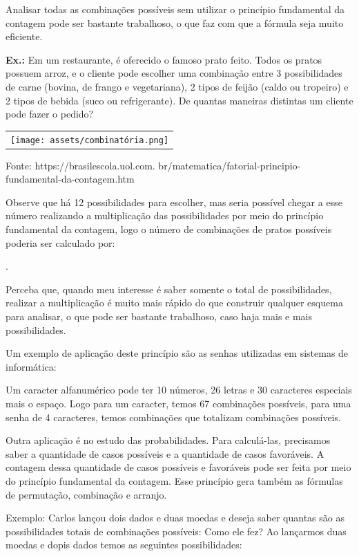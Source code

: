\begin{multicols*}{2}
Analisar todas as combinações possíveis sem utilizar o princípio fundamental da contagem pode ser bastante trabalhoso, o que faz com que a fórmula seja muito eficiente.

\textbf{Ex.:} Em um restaurante, é oferecido o famoso prato feito. Todos os pratos possuem arroz, e o cliente pode escolher uma combinação entre 3 possibilidades de carne (bovina, de frango e vegetariana), 2 tipos de feijão (caldo ou tropeiro) e 2 tipos de bebida (suco ou refrigerante). De quantas maneiras distintas um cliente pode fazer o pedido?

        	\begin{tabular}{@{}c@{}}
      		\texttt{[image: assets/combinatória.png]}
    		\end{tabular}   
			Fonte: https://brasilescola.uol.com. br/matematica/fatorial-principio- fundamental-da-contagem.htm
		
			Observe que há 12 possibilidades para escolher, mas seria possível chegar a esse número realizando a multiplicação das possibilidades por meio do princípio fundamental da contagem, logo o número de combinações de pratos possíveis poderia ser calculado por:

.

Perceba que, quando meu interesse é saber somente o total de possibilidades, realizar a multiplicação é muito mais rápido do que construir qualquer esquema para analisar, o que pode ser bastante trabalhoso, caso haja mais e mais possibilidades.

Um exemplo de aplicação deste princípio são as senhas utilizadas em sistemas de informática:

Um caracter alfanumérico pode ter 10 números, 26 letras e 30 caracteres especiais mais o espaço. Logo para um caracter, temos 67 combinações possíveis, para uma senha de 4 caracteres, temos  combinações que totalizam   combinações possíveis. 

Outra aplicação é no estudo das probabilidades. Para calculá-las, precisamos saber a quantidade de casos possíveis e a quantidade de casos favoráveis. A contagem dessa quantidade de casos possíveis e favoráveis pode ser feita por meio do princípio fundamental da contagem. Esse princípio gera também as fórmulas de permutação, combinação e arranjo.
		
Exemplo: Carlos lançou dois dados e duas moedas e deseja saber quantas são as possibilidades totais de combinações possíveis: Como ele fez?
Ao lançarmos duas moedas e dopis dados temos as seguintes possibilidades:


\end{multicols*}
